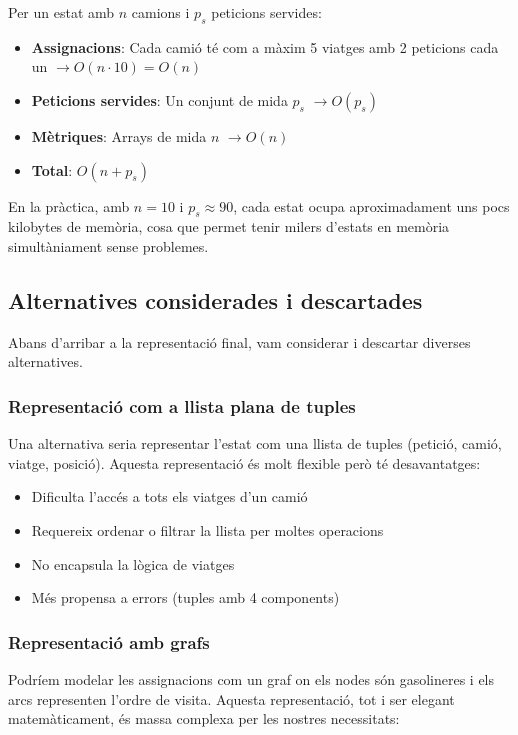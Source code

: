Per un estat amb $n$ camions i $p_s$ peticions servides:

\begin{itemize}
    \item \textbf{Assignacions}: Cada camió té com a màxim 5 viatges amb 2 peticions cada un $\rightarrow O(n \cdot 10) = O(n)$
    \item \textbf{Peticions servides}: Un conjunt de mida $p_s$ $\rightarrow O(p_s)$
    \item \textbf{Mètriques}: Arrays de mida $n$ $\rightarrow O(n)$
    \item \textbf{Total}: $O(n + p_s)$
\end{itemize}

En la pràctica, amb $n = 10$ i $p_s \approx 90$, cada estat ocupa aproximadament uns pocs kilobytes de memòria, cosa que permet tenir milers d'estats en memòria simultàniament sense problemes.


\subsection{Alternatives considerades i descartades}

Abans d'arribar a la representació final, vam considerar i descartar diverses alternatives.

\subsubsection{Representació com a llista plana de tuples}

Una alternativa seria representar l'estat com una llista de tuples (petició, camió, viatge, posició). Aquesta representació és molt flexible però té desavantatges:

\begin{itemize}
    \item Dificulta l'accés a tots els viatges d'un camió
    \item Requereix ordenar o filtrar la llista per moltes operacions
    \item No encapsula la lògica de viatges
    \item Més propensa a errors (tuples amb 4 components)
\end{itemize}

\subsubsection{Representació amb grafs}

Podríem modelar les assignacions com un graf on els nodes són gasolineres i els arcs representen l'ordre de visita. Aquesta representació, tot i ser elegant matemàticament, és massa complexa per les nostres necessitats:

